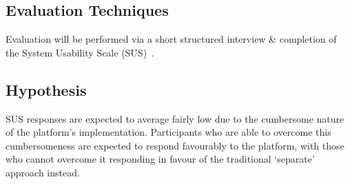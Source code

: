 



\subsection{Evaluation Techniques}
Evaluation will be performed via a short structured interview \& completion of the System Usability Scale (SUS)~\cite{Brooke1996}.


\subsection{Hypothesis}
SUS responses are expected to average fairly low due to the cumbersome nature of the platform's implementation. Participants who are able to overcome this cumbersomeness are expected to respond favourably to the platform, with those who cannot overcome it responding in favour of the traditional `separate' approach instead.


